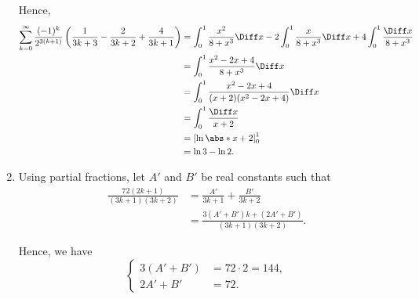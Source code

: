 \begin{enumerate}
          Hence,
          \begin{align*}
              \sum_{k = 0}^{\infty} \frac{(-1)^k}{2^{3(k + 1)}} \left(\frac{1}{3k + 3} - \frac{2}{3k + 2} + \frac{4}{3k + 1}\right) & = \int_{0}^{1} \frac{x^2}{8 + x^3} \Diff x - 2 \int_{0}^{1} \frac{x}{8 + x^3} \Diff x + 4 \int_{0}^{1} \frac{\Diff x}{8 + x^3} \\
                                                                                                                                    & = \int_{0}^{1} \frac{x^2 - 2x + 4}{8 + x^3} \Diff x                                                                            \\
                                                                                                                                    & = \int_{0}^{1} \frac{x^2 - 2x + 4}{(x + 2)(x^2 - 2x + 4)} \Diff x                                                              \\
                                                                                                                                    & = \int_{0}^{1} \frac{\Diff x}{x + 2}                                                                                           \\
                                                                                                                                    & = \left[\ln \abs*{x + 2}\right]_{0}^{1}                                                                                        \\
                                                                                                                                    & = \ln 3 - \ln 2.
          \end{align*}

    \item Using partial fractions, let \(A'\) and \(B'\) be real constants such that
          \begin{align*}
              \frac{72(2k + 1)}{(3k + 1)(3k + 2)} & = \frac{A'}{3k + 1} + \frac{B'}{3k + 2}               \\
                                                  & = \frac{3(A' + B')k + (2A' + B')}{(3k + 1) (3k + 2)}.
          \end{align*}

          Hence, we have
          \[
              \left\{\begin{aligned}
                  3(A' + B') & = 72 \cdot 2 = 144, \\
                  2A' + B'   & = 72.
              \end{aligned}\right.
          \]


\end{enumerate}
